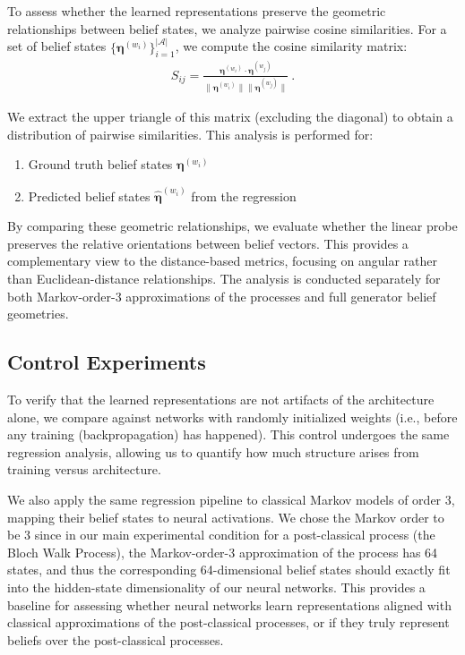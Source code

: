 \documentclass[prx,nofootinbib,onecolumn,showkeys,groupaddress,preprintnumbers,floatfix,
superscriptaddress]{revtex4-1}
\begin{document}
To assess whether the learned representations preserve the geometric relationships between belief states, we analyze pairwise cosine similarities. For a set of belief states $\{\boldsymbol{\eta}^{(w_i)}\}_{i=1}^{|\mathcal{A}|}$, we compute the cosine similarity matrix:
%
\begin{align}
S_{ij} = \frac{\boldsymbol{\eta}^{(w_i)} \cdot \boldsymbol{\eta}^{(w_j)}}{\|\boldsymbol{\eta}^{(w_i)}\| \|\boldsymbol{\eta}^{(w_j)}\|} ~.
\end{align}

We extract the upper triangle of this matrix (excluding the diagonal) to obtain a distribution of pairwise similarities. This analysis is performed for:
\begin{enumerate}
\item Ground truth belief states $\boldsymbol{\eta}^{(w_i)}$
\item Predicted belief states $\hat{\boldsymbol{\eta}}^{(w_i)}$ from the regression
\end{enumerate}

By comparing these geometric relationships, we evaluate whether the linear probe preserves the relative orientations between belief vectors. This provides a complementary view to the distance-based metrics, focusing on angular rather than Euclidean-distance relationships. The analysis is conducted separately for both Markov-order-3 approximations of the processes and full generator belief geometries.

\subsection{Control Experiments}


To verify that the learned representations are not artifacts of the architecture alone, we compare against networks with randomly initialized weights (i.e., before any training (backpropagation) has happened). This control undergoes the same regression analysis, allowing us to quantify how much structure arises from training versus architecture.

We also apply the same regression pipeline to classical Markov models of order 3, mapping their belief states to neural activations. We chose the Markov order to be 3 since in our main experimental condition for a post-classical process (the Bloch Walk Process), the Markov-order-3 approximation of the process has 64 states, and thus the corresponding 64-dimensional belief states should exactly fit into the hidden-state dimensionality of our neural networks. This provides a baseline for assessing whether neural networks learn representations aligned with classical approximations of the post-classical processes, or if they truly represent beliefs over the post-classical processes.
\end{document}
